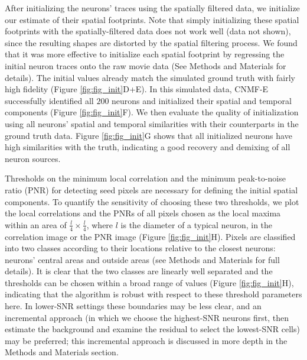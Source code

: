 \documentclass[9pt,lineno]{elife}
\begin{document}
After initializing the neurons' traces using the spatially filtered data, we initialize our estimate of their spatial footprints.
Note that simply initializing these spatial footprints with the spatially-filtered data does not work well (data not shown), since the resulting shapes are distorted by the spatial filtering process.  We found that it was more effective to initialize each spatial footprint by regressing the initial neuron traces onto the raw movie data (See Methods and Materials for details).
The initial values already match the simulated ground truth with fairly high fidelity (Figure \ref{fig:fig_init}D+E).
In this simulated data, CNMF-E successfully identified all $200$ neurons and initialized their spatial and temporal components (Figure \ref{fig:fig_init}F). We then evaluate the quality of initialization using all neurons' spatial and temporal similarities with their counterparts in the ground truth data. Figure \ref{fig:fig_init}G shows that all initialized neurons have high similarities with the truth, indicating a good recovery and demixing of all neuron sources. 

Thresholds on the minimum local correlation and the minimum peak-to-noise ratio (PNR) for detecting seed pixels are necessary for defining the initial spatial components. 
 To quantify the sensitivity of choosing these two thresholds, we plot the local correlations and the PNRs of all pixels  chosen as the local maxima within an area of $\frac{l}{4}\times \frac{l}{4}$, where $l$ is the diameter of a typical neuron,  in the correlation image or the PNR image (Figure \ref{fig:fig_init}H). Pixels are classified into two classes according to their  locations relative to the closest neurons: neurons' central areas  and outside areas (see Methods and Materials for full details).
 It is clear that the two classes are  linearly well separated and the thresholds can be chosen within a broad range of values (Figure \ref{fig:fig_init}H), indicating that the algorithm is robust with respect to these threshold parameters here.  In lower-SNR settings these boundaries may be less clear, and an incremental approach (in which we choose the highest-SNR neurons first, then estimate the background and examine the residual to select the lowest-SNR cells) may be preferred; this incremental approach is discussed in more depth in the Methods and Materials section.
 
\end{document}
